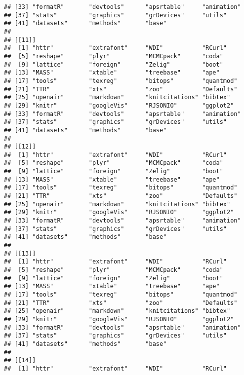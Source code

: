 \begin{knitrout}
\begin{kframe}
\begin{verbatim}
## [33] "formatR"       "devtools"      "apsrtable"     "animation"    
## [37] "stats"         "graphics"      "grDevices"     "utils"        
## [41] "datasets"      "methods"       "base"         
## 
## [[11]]
##  [1] "httr"          "extrafont"     "WDI"           "RCurl"        
##  [5] "reshape"       "plyr"          "MCMCpack"      "coda"         
##  [9] "lattice"       "foreign"       "Zelig"         "boot"         
## [13] "MASS"          "xtable"        "treebase"      "ape"          
## [17] "tools"         "texreg"        "bitops"        "quantmod"     
## [21] "TTR"           "xts"           "zoo"           "Defaults"     
## [25] "openair"       "markdown"      "knitcitations" "bibtex"       
## [29] "knitr"         "googleVis"     "RJSONIO"       "ggplot2"      
## [33] "formatR"       "devtools"      "apsrtable"     "animation"    
## [37] "stats"         "graphics"      "grDevices"     "utils"        
## [41] "datasets"      "methods"       "base"         
## 
## [[12]]
##  [1] "httr"          "extrafont"     "WDI"           "RCurl"        
##  [5] "reshape"       "plyr"          "MCMCpack"      "coda"         
##  [9] "lattice"       "foreign"       "Zelig"         "boot"         
## [13] "MASS"          "xtable"        "treebase"      "ape"          
## [17] "tools"         "texreg"        "bitops"        "quantmod"     
## [21] "TTR"           "xts"           "zoo"           "Defaults"     
## [25] "openair"       "markdown"      "knitcitations" "bibtex"       
## [29] "knitr"         "googleVis"     "RJSONIO"       "ggplot2"      
## [33] "formatR"       "devtools"      "apsrtable"     "animation"    
## [37] "stats"         "graphics"      "grDevices"     "utils"        
## [41] "datasets"      "methods"       "base"         
## 
## [[13]]
##  [1] "httr"          "extrafont"     "WDI"           "RCurl"        
##  [5] "reshape"       "plyr"          "MCMCpack"      "coda"         
##  [9] "lattice"       "foreign"       "Zelig"         "boot"         
## [13] "MASS"          "xtable"        "treebase"      "ape"          
## [17] "tools"         "texreg"        "bitops"        "quantmod"     
## [21] "TTR"           "xts"           "zoo"           "Defaults"     
## [25] "openair"       "markdown"      "knitcitations" "bibtex"       
## [29] "knitr"         "googleVis"     "RJSONIO"       "ggplot2"      
## [33] "formatR"       "devtools"      "apsrtable"     "animation"    
## [37] "stats"         "graphics"      "grDevices"     "utils"        
## [41] "datasets"      "methods"       "base"         
## 
## [[14]]
##  [1] "httr"          "extrafont"     "WDI"           "RCurl"        

\end{verbatim}
\end{kframe}
\end{knitrout}
